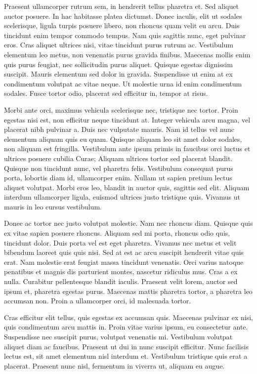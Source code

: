\documentclass{article}
\begin{document}
        Praesent ullamcorper rutrum sem, in hendrerit tellus pharetra et. Sed aliquet auctor posuere. In hac habitasse platea dictumst. Donec iaculis, elit ut sodales scelerisque, ligula turpis posuere libero, non rhoncus quam velit eu arcu. Duis tincidunt enim tempor commodo tempus. Nam quis sagittis nunc, eget pulvinar eros. Cras aliquet ultrices nisi, vitae tincidunt purus rutrum ac. Vestibulum elementum leo metus, non venenatis purus gravida finibus. Maecenas mollis enim quis purus feugiat, nec sollicitudin purus aliquet. Quisque egestas dignissim suscipit. Mauris elementum sed dolor in gravida. Suspendisse ut enim at ex condimentum volutpat ac vitae neque. Ut molestie urna id enim condimentum sodales. Fusce tortor odio, placerat sed efficitur in, tempor at risus.
    
        Morbi ante orci, maximus vehicula scelerisque nec, tristique nec tortor. Proin egestas nisi est, non efficitur neque tincidunt at. Integer vehicula arcu magna, vel placerat nibh pulvinar a. Duis nec vulputate mauris. Nam id tellus vel nunc elementum aliquam quis eu quam. Quisque aliquam leo sit amet dolor sodales, non aliquam est fringilla. Vestibulum ante ipsum primis in faucibus orci luctus et ultrices posuere cubilia Curae; Aliquam ultrices tortor sed placerat blandit. Quisque non tincidunt nunc, vel pharetra felis. Vestibulum consequat purus porta, lobortis diam id, ullamcorper enim. Nullam ut sapien pretium lectus aliquet volutpat. Morbi eros leo, blandit in auctor quis, sagittis sed elit. Aliquam interdum ullamcorper ligula, euismod ultrices justo tristique quis. Vivamus ut mauris in leo cursus vestibulum.
        
        Donec ac tortor nec justo volutpat molestie. Nam nec rhoncus diam. Quisque quis ex vitae sapien posuere rhoncus. Aliquam sed mi porta, rhoncus odio quis, tincidunt dolor. Duis porta vel est eget pharetra. Vivamus nec metus et velit bibendum laoreet quis quis nisi. Sed at est ac arcu suscipit hendrerit vitae quis erat. Nam molestie erat feugiat massa tincidunt venenatis. Orci varius natoque penatibus et magnis dis parturient montes, nascetur ridiculus mus. Cras a ex nulla. Curabitur pellentesque blandit iaculis. Praesent velit lorem, auctor sed ipsum et, pharetra egestas purus. Maecenas mattis pharetra tortor, a pharetra leo accumsan non. Proin a ullamcorper orci, id malesuada tortor.
        
        Cras efficitur elit tellus, quis egestas ex accumsan quis. Maecenas pulvinar ex nisi, quis condimentum arcu mattis in. Proin vitae varius ipsum, eu consectetur ante. Suspendisse nec suscipit purus, volutpat venenatis mi. Vestibulum volutpat aliquet diam ac faucibus. Praesent ut dui in nunc suscipit efficitur. Nunc facilisis lectus est, sit amet elementum nisl interdum et. Vestibulum tristique quis erat a placerat. Praesent nunc nisl, fermentum in viverra ut, aliquam eu augue.
    
\end{document}
